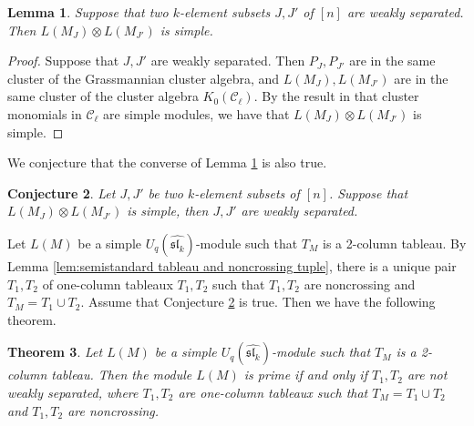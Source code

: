 \documentclass[12pt, reqno]{amsart}
\theoremstyle{plain}
\newtheorem{theorem}{Theorem}[section]
\newtheorem{lemma}[theorem]{Lemma}
\newtheorem{conjecture}[theorem]{Conjecture}
\theoremstyle{definition}
\numberwithin{equation}{section}
\begin{document}
\begin{lemma} \label{lem:I J weakly separated implies that tensor product is simple}
Suppose that two $k$-element subsets $J, J'$ of $[n]$ are weakly separated. Then $L(M_J) \otimes L(M_{J'})$ is simple.
\end{lemma}

\begin{proof}
Suppose that $J, J'$ are weakly separated. Then $P_{J}, P_{J'}$ are in the same cluster of the Grassmannian cluster algebra, and $L(M_{J}), L(M_{J'})$ are in the same cluster of the cluster algebra $K_0(\mathcal{C}_{\ell})$. By the result in \cite{Qin17, KKOP21, KKOP24} that cluster monomials in $\mathcal{C}_{\ell}$ are simple modules, we have that $L(M_{J}) \otimes L(M_{J'})$ is simple.
\end{proof}

We conjecture that the converse of Lemma \ref{lem:I J weakly separated implies that tensor product is simple} is also true.
\begin{conjecture} \label{conjecture: tensor product is simple implies that I J weakly separated}
Let $J, J'$ be two $k$-element subsets of $[n]$. Suppose that $L(M_J) \otimes L(M_{J'})$ is simple, then $J, J'$ are weakly separated.
\end{conjecture}

Let $L(M)$ be a simple $U_q(\widehat{\mathfrak{sl}_k})$-module such that $T_M$ is a 2-column tableau. By Lemma \ref{lem:semistandard tableau and noncrossing tuple}, there is a unique pair $T_1, T_2$ of one-column tableaux $T_1, T_2$ such that $T_1, T_2$ are noncrossing and $T_M = T_1 \cup T_2$. Assume that Conjecture \ref{conjecture: tensor product is simple implies that I J weakly separated} is true. Then we have the following theorem.
\begin{theorem} \label{thm: Uqslkhat modules corresponding to 2 column tableaux}
Let $L(M)$ be a simple $U_q(\widehat{\mathfrak{sl}_k})$-module such that $T_M$ is a 2-column tableau. Then the module $L(M)$ is prime if and only if $T_1, T_2$ are not weakly separated, where $T_1, T_2$ are one-column tableaux such that $T_M = T_1 \cup T_2$ and $T_1, T_2$ are noncrossing.
\end{theorem}
\end{document}
